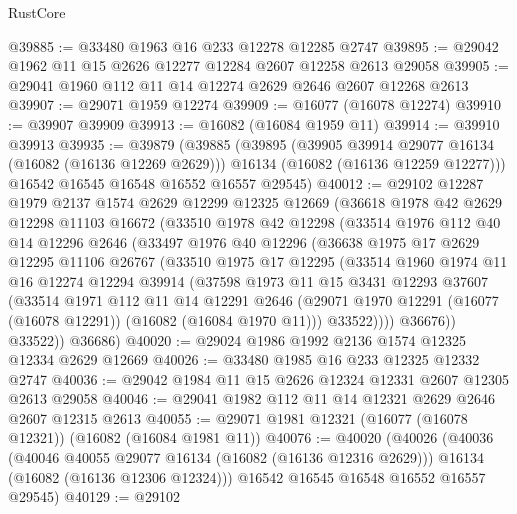 \begin{lexlean}{RustCore}
\begin{coremodule}
@39885 := @33480 @1963 @16 @233 @12278 @12285 @2747
@39895 := @29042 @1962 @11 @15 @2626 @12277 @12284 @2607 @12258 @2613 @29058
@39905 := @29041 @1960 @112 @11 @14 @12274 @2629 @2646 @2607 @12268 @2613
@39907 := @29071 @1959 @12274
@39909 := @16077 (@16078 @12274)
@39910 := @39907 @39909
@39913 := @16082 (@16084 @1959 @11)
@39914 := @39910 @39913
@39935 := @39879
    (@39885
      (@39895
        (@39905 @39914 @29077 @16134 (@16082 (@16136 @12269 @2629)))
        @16134
        (@16082 (@16136 @12259 @12277)))
      @16542
      @16545
      @16548
      @16552
      @16557
      @29545)
@40012 := @29102
    @12287
    @1979
    @2137
    @1574
    @2629
    @12299
    @12325
    @12669
    (@36618
      @1978
      @42
      @2629
      @12298
      @11103
      @16672
      (@33510
        @1978
        @42
        @12298
        (@33514
          @1976
          @112
          @40
          @14
          @12296
          @2646
          (@33497
            @1976
            @40
            @12296
            (@36638
              @1975
              @17
              @2629
              @12295
              @11106
              @26767
              (@33510
                @1975
                @17
                @12295
                (@33514
                  @1960
                  @1974
                  @11
                  @16
                  @12274
                  @12294
                  @39914
                  (@37598
                    @1973
                    @11
                    @15
                    @3431
                    @12293
                    @37607
                    (@33514
                      @1971
                      @112
                      @11
                      @14
                      @12291
                      @2646
                      (@29071 @1970 @12291 (@16077 (@16078 @12291)) (@16082 (@16084 @1970 @11)))
                      @33522))))
              @36676))
          @33522))
      @36686)
@40020 := @29024 @1986 @1992 @2136 @1574 @12325 @12334 @2629 @12669
@40026 := @33480 @1985 @16 @233 @12325 @12332 @2747
@40036 := @29042 @1984 @11 @15 @2626 @12324 @12331 @2607 @12305 @2613 @29058
@40046 := @29041 @1982 @112 @11 @14 @12321 @2629 @2646 @2607 @12315 @2613
@40055 := @29071 @1981 @12321 (@16077 (@16078 @12321)) (@16082 (@16084 @1981 @11))
@40076 := @40020
    (@40026
      (@40036
        (@40046 @40055 @29077 @16134 (@16082 (@16136 @12316 @2629)))
        @16134
        (@16082 (@16136 @12306 @12324)))
      @16542
      @16545
      @16548
      @16552
      @16557
      @29545)
@40129 := @29102

\end{coremodule}
\end{lexlean}

